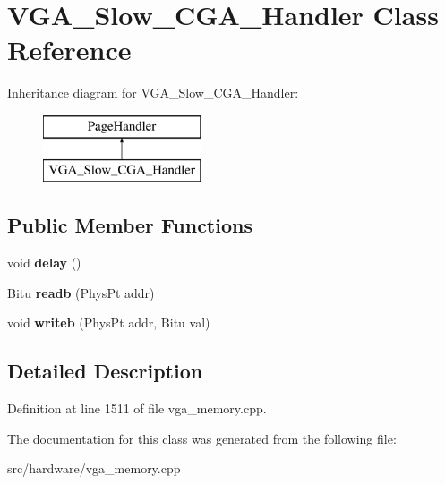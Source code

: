 \hypertarget{classVGA__Slow__CGA__Handler}{\section{V\-G\-A\-\_\-\-Slow\-\_\-\-C\-G\-A\-\_\-\-Handler Class Reference}
\label{classVGA__Slow__CGA__Handler}
}
Inheritance diagram for V\-G\-A\-\_\-\-Slow\-\_\-\-C\-G\-A\-\_\-\-Handler\-:\begin{figure}[H]
\begin{center}
\leavevmode
\includegraphics[height=2.000000cm]{classVGA__Slow__CGA__Handler}
\end{center}
\end{figure}
\subsection*{Public Member Functions}
\begin{DoxyCompactItemize}
\item 
\hypertarget{classVGA__Slow__CGA__Handler_af8dd584b1fbb765acffe039b47f21181}{void {\bfseries delay} ()}\label{classVGA__Slow__CGA__Handler_af8dd584b1fbb765acffe039b47f21181}

\item 
\hypertarget{classVGA__Slow__CGA__Handler_a0724a16ab5641b5436d5505a81438d47}{Bitu {\bfseries readb} (Phys\-Pt addr)}\label{classVGA__Slow__CGA__Handler_a0724a16ab5641b5436d5505a81438d47}

\item 
\hypertarget{classVGA__Slow__CGA__Handler_a26591aafbb6125366d6e5607ae330077}{void {\bfseries writeb} (Phys\-Pt addr, Bitu val)}\label{classVGA__Slow__CGA__Handler_a26591aafbb6125366d6e5607ae330077}

\end{DoxyCompactItemize}


\subsection{Detailed Description}


Definition at line 1511 of file vga\-\_\-memory.\-cpp.



The documentation for this class was generated from the following file\-:\begin{DoxyCompactItemize}
\item 
src/hardware/vga\-\_\-memory.\-cpp\end{DoxyCompactItemize}
